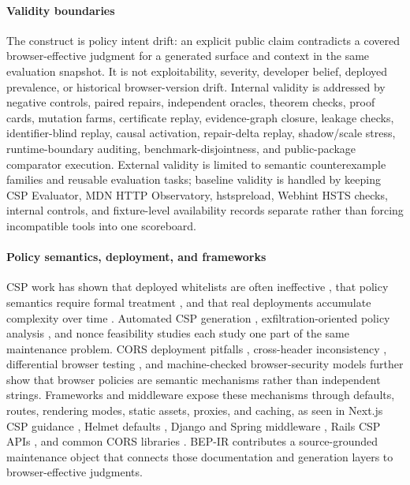 \documentclass[10pt,conference]{IEEEtran}
\begin{document}
\paragraph{Validity boundaries}
The construct is policy intent drift: an explicit public claim contradicts a covered browser-effective judgment for a generated surface and context in the same evaluation snapshot. It is not exploitability, severity, developer belief, deployed prevalence, or historical browser-version drift. Internal validity is addressed by negative controls, paired repairs, independent oracles, theorem checks, proof cards, mutation farms, certificate replay, evidence-graph closure, leakage checks, identifier-blind replay, causal activation, repair-delta replay, shadow/scale stress, runtime-boundary auditing, benchmark-disjointness, and public-package comparator execution. External validity is limited to semantic counterexample families and reusable evaluation tasks; baseline validity is handled by keeping CSP Evaluator, MDN HTTP Observatory, hstspreload, Webhint HSTS checks, internal controls, and fixture-level availability records separate rather than forcing incompatible tools into one scoreboard.

\paragraph{Policy semantics, deployment, and frameworks}
CSP work has shown that deployed whitelists are often ineffective \cite{weichselbaum_csp_dead_2016}, that policy semantics require formal treatment \cite{calzavara_csp_semantics_2018}, and that real deployments accumulate complexity over time \cite{roth_complex_csp_2020}. Automated CSP generation \cite{pan_cspautogen_2016}, exfiltration-oriented policy analysis \cite{vanacker_data_exfiltration_2016}, and nonce feasibility studies \cite{golinelli_nonce_2023,ren_nonce_csp_2025} each study one part of the same maintenance problem. CORS deployment pitfalls \cite{chen_cors_2018}, cross-header inconsistency \cite{calzavara_site_policy_2021,calzavara_two_headers_2020}, differential browser testing \cite{wi_diffcsp_2023}, and machine-checked browser-security models \cite{veronese_webspec_2023} further show that browser policies are semantic mechanisms rather than independent strings. Frameworks and middleware expose these mechanisms through defaults, routes, rendering modes, static assets, proxies, and caching, as seen in Next.js CSP guidance \cite{nextjs_csp_2026}, Helmet defaults \cite{helmet_docs_2026}, Django and Spring middleware \cite{django_security_middleware_2026,spring_security_headers_2026}, Rails CSP APIs \cite{rails_csp_api_2026}, and common CORS libraries \cite{express_cors_2026,aspnet_core_cors_2026}. BEP-IR contributes a source-grounded maintenance object that connects those documentation and generation layers to browser-effective judgments.
\end{document}
